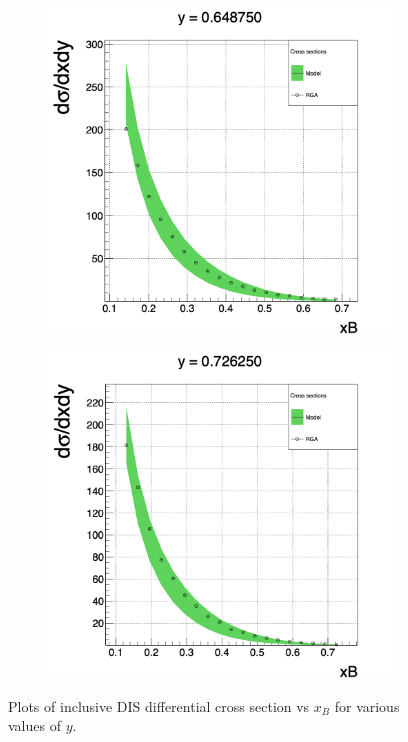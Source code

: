 \begin{figure}[h!]
	\centering
	\begin{subfigure}[b]{0.44\linewidth}
		\includegraphics[width=\linewidth]{figures/rga/xsec_4.png}
		\label{fig:rga_xsec4}
	\end{subfigure}
	\begin{subfigure}[b]{0.44\textwidth}
		\includegraphics[width=\linewidth]{figures/rga/xsec_5.png}
		\label{fig:rga_xsec5}
	\end{subfigure}
	\caption{Plots of inclusive DIS differential cross section vs $x_B$ for various values of $y$.}
	\label{fig:rga_xsec_plots}
\end{figure}




